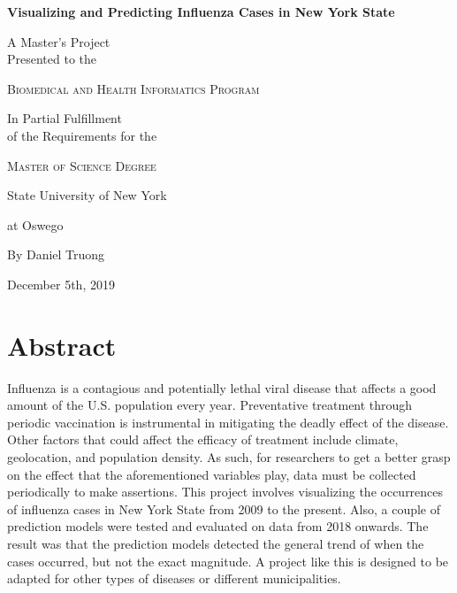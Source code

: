 \documentclass[12pt]{article}
\begin{document}
	\begin{titlingpage}
	\centering
    	{\huge\bfseries Visualizing and Predicting Influenza Cases in New York State\par}
    	\vspace{2cm}

	{\Large  A Master’s Project \\}	
	{\Large  Presented to the \\}	
    	{\scshape\LARGE Biomedical and Health Informatics Program \par}
	
	\vfill
    	{\Large  In Partial Fulfillment \\}	
	{\Large  of the Requirements for the \\}
    	{\scshape\LARGE Master of Science Degree \par}
	
	\vfill
	{\LARGE State University of New York \par}
	{\LARGE  at Oswego\par}

	\vfill
	{\Large By Daniel Truong\par}
	{\large December 5th, 2019\par}
	\end{titlingpage}


\section{Abstract}

Influenza is a contagious and potentially lethal viral disease that affects a good amount of the U.S. population every year. Preventative treatment through periodic vaccination is instrumental in mitigating the deadly effect of the disease. Other factors that could affect the efficacy of treatment include climate, geolocation, and population density. As such, for researchers to get a better grasp on the effect that the aforementioned variables play, data must be collected periodically to make assertions. This project involves visualizing the occurrences of influenza cases in New York State from 2009 to the present. Also, a couple of prediction models were tested and evaluated on data from 2018 onwards. The result was that the prediction models detected the general trend of when the cases occurred, but not the exact magnitude. A project like this is designed to be adapted for other types of diseases or different municipalities.

\newpage
\end{document}
